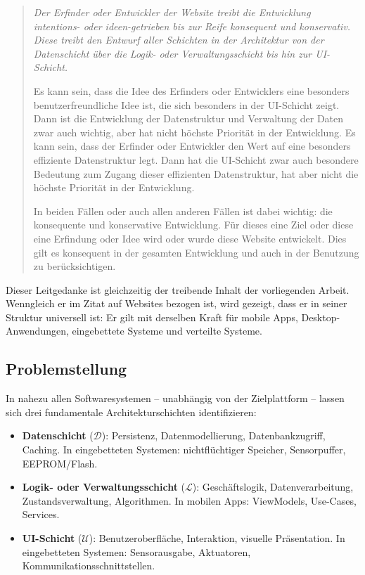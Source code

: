 ﻿\documentclass[a4paper,12pt]{article}
\theoremstyle{definition}
\begin{document}
\begin{quote}
\itshape
\glqq{}Der Erfinder oder Entwickler der Website treibt die Entwicklung
intentions- oder ideen-getrieben bis zur Reife konsequent und konservativ.
Diese treibt den Entwurf aller Schichten in der Architektur von der Datenschicht
über die Logik- oder Verwaltungsschicht bis hin zur UI-Schicht.

Es kann sein, dass die Idee des Erfinders oder Entwicklers eine besonders
benutzerfreundliche Idee ist, die sich besonders in der UI-Schicht zeigt.
Dann ist die Entwicklung der Datenstruktur und Verwaltung der Daten zwar auch
wichtig, aber hat nicht höchste Priorität in der Entwicklung. Es kann sein,
dass der Erfinder oder Entwickler den Wert auf eine besonders effiziente
Datenstruktur legt. Dann hat die UI-Schicht zwar auch besondere Bedeutung
zum Zugang dieser effizienten Datenstruktur, hat aber nicht die höchste
Priorität in der Entwicklung.

In beiden Fällen oder auch allen anderen Fällen ist dabei wichtig: die
konsequente und konservative Entwicklung. Für dieses eine Ziel oder diese
eine Erfindung oder Idee wird oder wurde diese Website entwickelt. Dies gilt
es konsequent in der gesamten Entwicklung und auch in der Benutzung zu
berücksichtigen.\grqq{} \upshape\cite{epp2026paradigma}
\end{quote}

Dieser Leitgedanke ist gleichzeitig der treibende Inhalt der vorliegenden Arbeit.
Wenngleich er im Zitat auf Websites bezogen ist, wird gezeigt, dass er in seiner
Struktur universell ist: Er gilt mit derselben Kraft für mobile Apps,
Desktop-Anwendungen, eingebettete Systeme und verteilte Systeme.

\subsection{Problemstellung}

In nahezu allen Softwaresystemen -- unabhängig von der Zielplattform -- lassen
sich drei fundamentale Architekturschichten identifizieren:

\begin{itemize}
    \item \textbf{Datenschicht} ($\mathcal{D}$): Persistenz, Datenmodellierung,
          Datenbankzugriff, Caching. In eingebetteten Systemen: nichtflüchtiger
          Speicher, Sensorpuffer, EEPROM/Flash.
    \item \textbf{Logik- oder Verwaltungsschicht} ($\mathcal{L}$):
          Geschäftslogik, Datenverarbeitung, Zustandsverwaltung, Algorithmen.
          In mobilen Apps: ViewModels, Use-Cases, Services.
    \item \textbf{UI-Schicht} ($\mathcal{U}$): Benutzeroberfläche, Interaktion,
          visuelle Präsentation. In eingebetteten Systemen: Sensorausgabe,
          Aktuatoren, Kommunikationsschnittstellen.
\end{itemize}
\end{document}
